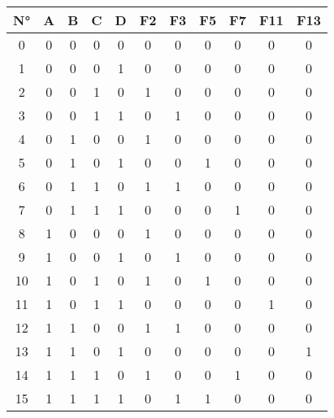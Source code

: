 \begin{enumerate}
\begin{tabular}{|c|c|c|c|c||c|c|c|c|c|c|}
        N° &A & B & C & D & F2 & F3 & F5 & F7 & F11 & F13\\ \midrule
0 & 0 & 0 & 0 & 0 & 0 & 0 & 0 & 0 & 0 & 0\\
1 & 0 & 0 & 0 & 1 & 0 & 0 & 0 & 0 & 0 & 0\\
2 & 0 & 0 & 1 & 0 & 1 & 0 & 0 & 0 & 0 & 0\\
3 & 0 & 0 & 1 & 1 & 0 & 1 & 0 & 0 & 0 & 0\\
\midrule
4 & 0 & 1 & 0 & 0 & 1 & 0 & 0 & 0 & 0 & 0\\
5 & 0 & 1 & 0 & 1 & 0 & 0 & 1 & 0 & 0 & 0\\
6 & 0 & 1 & 1 & 0 & 1 & 1 & 0 & 0 & 0 & 0\\
7 & 0 & 1 & 1 & 1 & 0 & 0 & 0 & 1 & 0 & 0\\
\midrule
8 & 1 & 0 & 0 & 0 & 1 & 0 & 0 & 0 & 0 & 0\\
9 & 1 & 0 & 0 & 1 & 0 & 1 & 0 & 0 & 0 & 0\\
10 & 1 & 0 & 1 & 0 & 1 & 0 & 1 & 0 & 0 & 0\\
11 & 1 & 0 & 1 & 1 & 0 & 0 & 0 & 0 & 1 & 0\\
\midrule
12 & 1 & 1 & 0 & 0 & 1 & 1 & 0 & 0 & 0 & 0\\
13 & 1 & 1 & 0 & 1 & 0 & 0 & 0 & 0 & 0 & 1\\
14 & 1 & 1 & 1 & 0 & 1 & 0 & 0 & 1 & 0 & 0\\
15 & 1 & 1 & 1 & 1 & 0 & 1 & 1 & 0 & 0 & 0\\
\bottomrule

        \end{tabular}



\end{enumerate}
